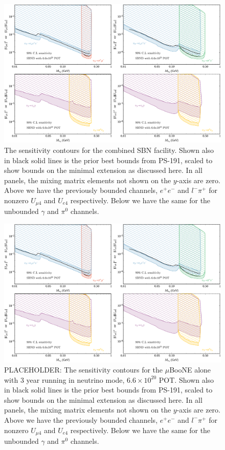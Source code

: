 \documentclass[11pt, a4paper]{article}
\begin{document}
\begin{figure}[t]
\center
\includegraphics[width=1.0\textwidth]{figures/band_sbn.pdf}

\caption{\label{fig:band_sbn}The sensitivity contours for the combined SBN
facility. Shown also in black solid lines is the prior best bounds from PS-191,
scaled to show bounds on the minimal extension as discussed here. In all
panels, the mixing matrix elements not shown on the $y$-axis are zero. Above we
have the previously bounded channels, $e^+e^-$ and $l^- \pi^+$ for nonzero
$U_{\mu 4}$ and $U_{e4}$ respectively. Below we have the same for the unbounded
$\gamma$ and $\pi^0$ channels.}

\end{figure}

\begin{figure}[t]
\center
\includegraphics[width=1.0\textwidth]{figures/band_sbn.pdf}

\caption{\label{fig:band_muboone} PLACEHOLDER: The sensitivity contours for the
$\mu$BooNE alone with  3 year running in neutrino mode, $6.6\times 10^{20}$
POT. Shown also in black solid lines is the prior best bounds from PS-191,
scaled to show bounds on the minimal extension as discussed here. In all
panels, the mixing matrix elements not shown on the $y$-axis are zero. Above we
have the previously bounded channels, $e^+e^-$ and $l^- \pi^+$ for nonzero
$U_{\mu 4}$ and $U_{e4}$ respectively. Below we have the same for the unbounded
$\gamma$ and $\pi^0$ channels.}

\end{figure}
\end{document}

